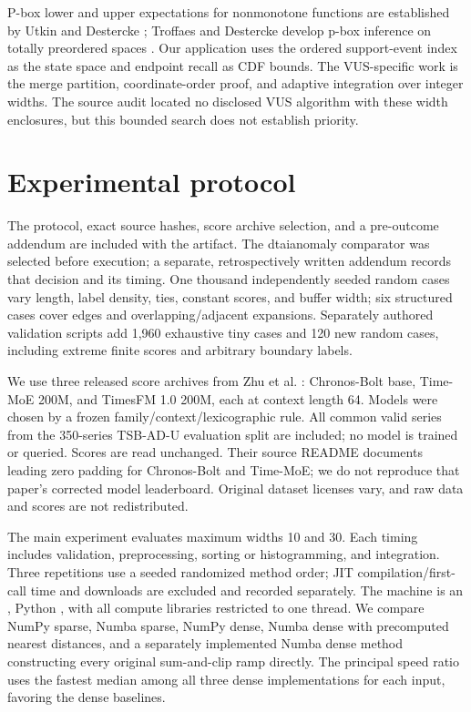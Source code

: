 P-box lower and upper expectations for nonmonotone functions are established
by Utkin and Destercke \cite{utkin2009}; Troffaes and Destercke develop p-box
inference on totally preordered spaces \cite{troffaes2011}.
Our application uses the ordered support-event index as the state space and
endpoint recall as CDF bounds. The VUS-specific work is the merge partition,
coordinate-order proof, and adaptive integration over integer widths.
The source audit located no disclosed VUS algorithm with these width
enclosures, but this bounded search does not establish priority.

\section{Experimental protocol}
The protocol, exact source hashes, score archive selection, and a pre-outcome
addendum are included with the artifact. The dtaianomaly comparator was selected
before execution; a separate, retrospectively written addendum records that
decision and its timing. One thousand independently seeded
random cases vary length, label density, ties, constant scores, and buffer
width; six structured cases cover edges and overlapping/adjacent expansions.
Separately authored validation scripts add 1,960 exhaustive tiny cases and 120 new random
cases, including extreme finite scores and arbitrary boundary labels.

We use three released score archives from Zhu et al. \cite{zhu2026}: Chronos-Bolt
base, Time-MoE 200M, and TimesFM 1.0 200M, each at context length 64. Models were
chosen by a frozen family/context/lexicographic rule. All common valid series
from the 350-series TSB-AD-U evaluation split \cite{tsbad} are included; no model is trained
or queried. Scores are read unchanged. Their source README documents leading
zero padding for Chronos-Bolt and Time-MoE; we do not reproduce that paper's
corrected model leaderboard. Original dataset licenses vary, and raw data and
scores are not redistributed.

The main experiment evaluates maximum widths 10 and 30. Each timing includes
validation, preprocessing, sorting or histogramming, and integration. Three
repetitions use a seeded randomized method order; JIT compilation/first-call
time and downloads are excluded and recorded separately. The machine is an
\MachineCPU{}, Python \PythonVersion{}, with all compute libraries restricted
to one thread. We compare NumPy sparse, Numba sparse, NumPy dense, Numba dense
with precomputed nearest distances, and a separately implemented Numba dense
method constructing every original sum-and-clip ramp directly. The principal
speed ratio uses the fastest median among all three dense implementations for
each input, favoring the dense baselines.


